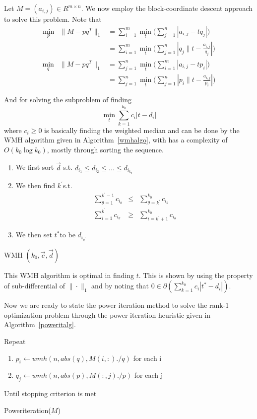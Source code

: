 Let $M=(a_{i,j})\in R^{m \times n}$. We now employ the block-coordinate descent approach to solve this problem. Note that
%
\begin{eqnarray}
\min_{p} & \|M-pq^{T}\|_{1} & =\sum_{i=1}^{m}\min_{t}\biggl(\sum_{j=1}^{n}|a_{i,j}-tq_{j}|\biggr)\\
 &  & =\sum_{i=1}^{m}\min_{t}\biggl(\sum_{j=1}^{n}|q_{j}\|t-\frac{a_{i,j}}{q_{j}}|\biggr)\nonumber
\end{eqnarray}
\begin{eqnarray}
\min_{q} & \|M-pq^{T}\|_{1} & =\sum_{j=1}^{n}\min_{t}\biggl(\sum_{i=1}^{m}|a_{i,j}-tp_{i}|\biggr)\\
 &  & =\sum_{j=1}^{n}\min_{t}\biggl(\sum_{j=1}^{n}|p_{i}\|t-\frac{a_{i,j}}{p_{i}}|\biggr)\nonumber
\end{eqnarray}


And for solving the subproblem of finding
\[
\min_{t}\sum_{k=1}^{k_{0}}c_{i}|t-d_{i}|
\]
where $c_{i}\ge0$ is basically finding the weighted median and can be done by the WMH algorithm given in Algorithm~\ref{wmhalgo}, with has a complexity of $O(k_{0}\log k_{0})$, mostly through sorting the sequence.

\begin{algorithm}[h]
\begin{enumerate}
\item We first sort $\vec{\ensuremath{d}}$ s.t. $d_{i_{1}}\le d_{i_{2}}\le...\le d_{i_{k_{0}}}$
\item We then find $k^{'}$s.t.
\begin{eqnarray*}
\sum_{\theta=1}^{k^{'}-1}c_{i_{\theta}} & \le & \sum_{\theta=k^{'}}^{k_{0}}c_{i_{\theta}}\\
\sum_{i=1}^{k^{'}}c_{i_{\theta}} & \ge & \sum_{i=k^{'}+1}^{k_{0}}c_{i_{\theta}}
\end{eqnarray*}
\item We then set $t^{*}$to be $d_{i_{k^{'}}}$
\end{enumerate}
\caption{WMH $(k_{0},\vec{c},\vec{d})$}
\label{wmhalgo}
\end{algorithm}
% 
This WMH algorithm is optimal in finding $t$. This is shown by using the property of sub-differential of $\|\cdot\|_{1}$ and by noting that
$0\in\partial(\sum_{k=1}^{k_{0}}c_{i}|t^{*}-d_{i}|)$. 

Now we are ready to state the power iteration method to solve the rank-1 optimization problem through the power iteration heuristic given in Algorithm~\ref{poweritalg}.

\begin{algorithm}[h]
Repeat
\begin{enumerate}
\item $p_{i}\leftarrow wmh(n,abs(q),M(i,:)./q)$ for each i
\item $q_{j}\leftarrow wmh(n,abs(p),M(:,j)./p)$ for each j
\end{enumerate}
Until stopping criterion is met
\caption{Poweriteration($M$)}
\label{poweritalg}
\end{algorithm}

